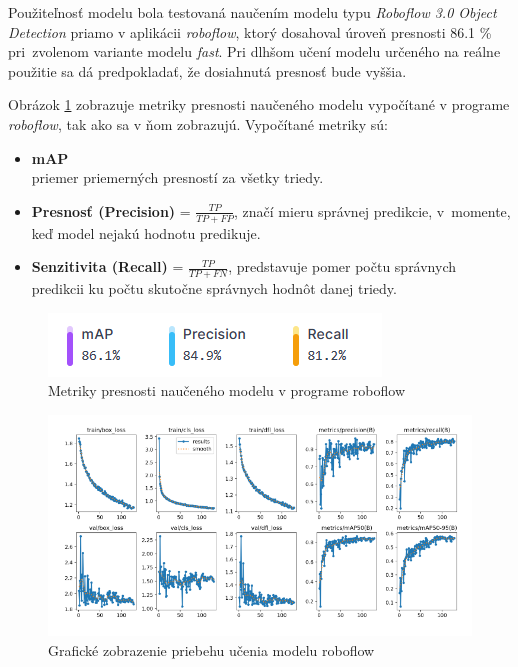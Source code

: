     Použiteľnosť modelu bola testovaná naučením modelu typu \emph{Roboflow 3.0 Object Detection} priamo v aplikácii \emph{roboflow}, ktorý dosahoval úroveň presnosti 86.1 \% pri~zvolenom variante modelu \emph{fast}. Pri dlhšom učení modelu určeného na reálne použitie sa dá predpokladať, že dosiahnutá presnosť bude vyššia.

    Obrázok \ref{fig:roboflow_metrics} zobrazuje metriky presnosti naučeného modelu vypočítané v programe \emph{roboflow}, tak ako sa v ňom zobrazujú. Vypočítané metriky sú:

    \begin{itemize}
        \item \textbf{\ac{mAP}} \\ priemer priemerných presností za všetky triedy.
        \item \textbf{Presnosť (Precision)} = \(\frac{TP}{TP + FP}\), značí mieru správnej predikcie, v~momente, keď model nejakú hodnotu predikuje.
        \item \textbf{Senzitivita (Recall)} = \(\frac{TP}{TP + FN}\), predstavuje pomer počtu správnych predikcii ku počtu skutočne správnych hodnôt danej triedy.
    \end{itemize}

    \begin{figure}[H]
        \centering
        \includegraphics[width=.35\textwidth]{obrazky/roboflow/metrics.png}
        \caption{Metriky presnosti naučeného modelu v programe roboflow}
        \label{fig:roboflow_metrics}
    \end{figure}

    \begin{figure}[H]
        \centering
        \includegraphics[width=.8\textwidth]{obrazky/roboflow/train.png}
        \caption{Grafické zobrazenie priebehu učenia modelu roboflow}
    \end{figure}

